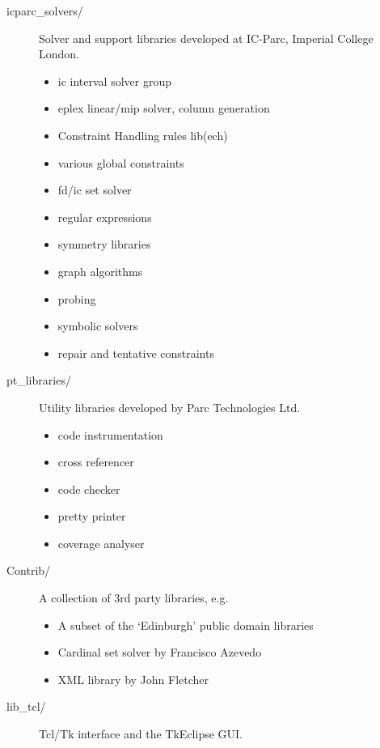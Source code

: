 \documentclass[11pt,a4paper]{book}
\begin{document}
\begin{description}
\item[icparc_solvers/] Solver and support libraries developed at IC-Parc,
	Imperial College London.
    \begin{itemize}
    \item ic interval solver group
    \item eplex linear/mip solver, column generation
    \item Constraint Handling rules lib(ech)
    \item various global constraints
    \item fd/ic set solver
    \item regular expressions
    \item symmetry libraries
    \item graph algorithms
    \item probing
    \item symbolic solvers
    \item repair and tentative constraints
    \end{itemize}

\item[pt_libraries/] Utility libraries developed by Parc Technologies Ltd.
    \begin{itemize}
    \item code instrumentation
    \item cross referencer
    \item code checker
    \item pretty printer
    \item coverage analyser
    \end{itemize}

\item[Contrib/] A collection of 3rd party libraries, e.g.
    \begin{itemize}
    \item A subset of the `Edinburgh' public domain libraries
    \item Cardinal set solver by Francisco Azevedo
    \item XML library by John Fletcher
    \end{itemize}

\item[lib_tcl/] Tcl/Tk interface and the TkEclipse GUI.


\end{description}
\end{document}
